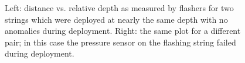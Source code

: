\begin{figure}[!h]
  \captionsetup[subfigure]{labelformat=empty}
  \centering
  \caption{Left: distance vs. relative depth as measured by flashers for two strings which were deployed at nearly the same depth with no anomalies during deployment. Right: the same plot for a different pair; in this case the pressure sensor on the flashing string failed during deployment.}
  \label{fig:geohyperbola}
\end{figure}


